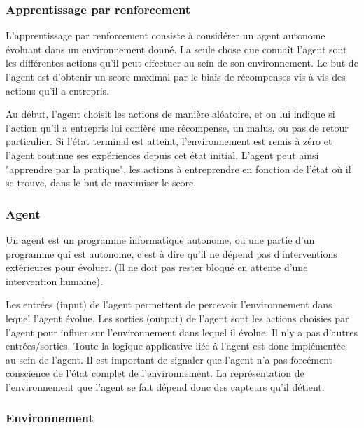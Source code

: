 \documentclass[11pt,a4paper]{report}
\begin{document}
  \subsubsection{Apprentissage par renforcement}  
  
    \par L'apprentissage par renforcement consiste à considérer un agent autonome évoluant dans un environnement donné. La seule chose que connaît l'agent sont les différentes actions qu'il peut effectuer au sein de son environnement. Le but de l'agent est d'obtenir un score maximal par le biais de récompenses vis à vis des actions qu'il a entrepris.
    
    \par Au début, l'agent choisit les actions de manière aléatoire, et on lui indique si l'action qu'il a entrepris lui confère une récompense, un malus, ou pas de retour particulier. Si l'état terminal est atteint, l'environnement est remis à zéro et l'agent continue ses expériences depuis cet état initial. L'agent peut ainsi "apprendre par la pratique", les actions à entreprendre en fonction de l'état où il se trouve, dans le but de maximiser le score.
  
  \subsubsection{Agent}
  
    \par Un agent est un programme informatique autonome, ou une partie d'un programme qui est autonome, c'est à dire qu'il ne dépend pas d'interventions extérieures pour évoluer. (Il ne doit pas rester bloqué en attente d'une intervention humaine). 
    
    \par Les entrées (input) de l'agent permettent de percevoir l'environnement dans lequel l'agent évolue. Les sorties (output) de l'agent sont les actions choisies par l'agent pour influer sur l'environnement dans lequel il évolue. Il n'y a pas d'autres entrées/sorties. Toute la logique applicative liée à l'agent est donc implémentée au sein de l'agent. Il est important de signaler que l'agent n'a pas forcément conscience de l'état complet de l'environnement. La représentation de l'environnement que l'agent se fait dépend donc des capteurs qu'il détient. 
   
  \subsubsection{Environnement}
  
\end{document}
